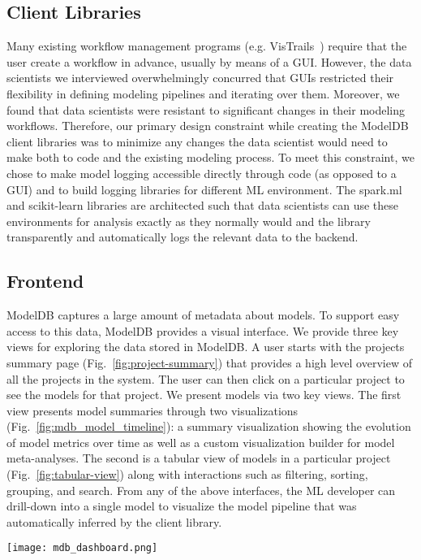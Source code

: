 \documentclass[11pt]{article}
\newcommand{\mdb}{{\sc ModelDB}\xspace}
\newcommand{\dss}{data scientists\xspace}
\newcommand{\ds}{data scientist\xspace}
\newcommand{\mldev}{ML developer\xspace}
\begin{document}
\subsection{Client Libraries}
Many existing workflow management programs (e.g. VisTrails~\cite{callahan2006vistrails}) require that the user create a workflow in advance, usually by means of a GUI. 
However, the \dss we interviewed overwhelmingly concurred that GUIs restricted their flexibility in defining modeling pipelines and iterating over them. 
Moreover, we found that \dss were resistant to significant changes in their modeling workflows.
Therefore, our primary design constraint while creating the \mdb client libraries was to minimize any changes the \ds would need to make both to code and the existing modeling process. To meet this constraint, we chose to make model logging accessible directly through code (as opposed to a GUI) and to build logging libraries for different ML environment. 
The spark.ml and scikit-learn libraries are architected such that \dss can use these environments for analysis exactly as they normally would and the library transparently and automatically logs the relevant data to the backend.
\subsection{Frontend}
\label{sec:mdb_frontend}

\mdb captures a large amount of metadata about models.
To support easy access to this data, \mdb provides a visual interface.
We provide three key views for exploring the data stored in \mdb.
A user starts with the projects summary page (Fig.~\ref{fig:project-summary}) 
that provides a high level overview of all the projects in the system.
The user can then click on a particular project to see the models for that project.
We present models via two key views.
The first view presents model summaries through two visualizations (Fig.~\ref{fig:mdb_model_timeline}): a summary visualization showing the evolution of model metrics over time as well as a custom visualization builder for model meta-analyses.
The second is a tabular view of models in a particular project (Fig.~\ref{fig:tabular-view}) along with interactions such as filtering, sorting, grouping, and search.
From any of the above interfaces, the \mldev can drill-down into a single model to visualize the model pipeline that was automatically inferred by the client library.

\begin{figure*}
  \centering
  \texttt{[image: mdb\_dashboard.png]}
  \caption{\label{fig:project-summary} Projects Summary View}
\end{figure*}
\end{document}
